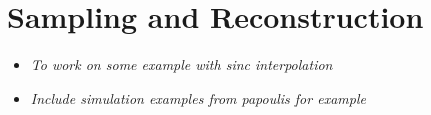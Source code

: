

\chapter{Sampling and Reconstruction}
\label{Chap:Sampling_Reconstruction}


\begin{itemize}

\item \textit{To work on some example with sinc interpolation}

\item \textit{Include simulation examples from papoulis for example}

\end{itemize}